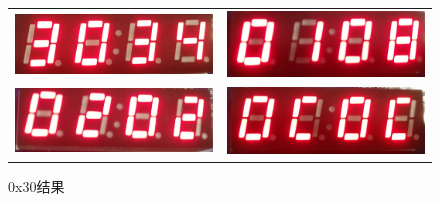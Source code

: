 \documentclass[12pt,UTF8]{ctexart}
\begin{document}
\begin{spacing}{1.1}
\begin{enumerate}
\begin{figure}[H]
\begin{tabular}{cc}
    \includegraphics[width=0.3\linewidth]{fig/Implementation/0x30_00.jpg}&
    \includegraphics[width=0.3\linewidth]{fig/Implementation/0x30_01.jpg}\\
    \includegraphics[width=0.3\linewidth]{fig/Implementation/0x30_10.jpg}&
    \includegraphics[width=0.3\linewidth]{fig/Implementation/0x30_11.jpg}
    \end{tabular}
    \caption{0x30结果}
    \end{figure}
\end{enumerate}


\end{spacing}
\end{document}
